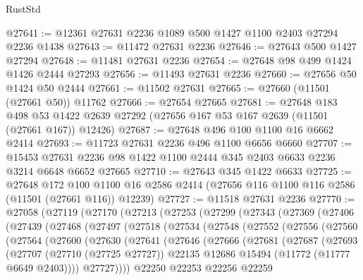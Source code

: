 \begin{lexlean}{RustStd}
\begin{coremodule}
@27641 := @12361 @27631 @2236 @1089 @500 @1427 @1100 @2403 @27294 @2236 @1438
@27643 := @11472 @27631 @2236
@27646 := @27643 @500 @1427 @27294
@27648 := @11481 @27631 @2236
@27654 := @27648 @98 @499 @1424 @1426 @2444 @27293
@27656 := @11493 @27631 @2236
@27660 := @27656 @50 @1424 @50 @2444
@27661 := @11502 @27631
@27665 := @27660 (@11501 (@27661 @50)) @11762
@27666 := @27654 @27665
@27681 := @27648
    @183
    @498
    @53
    @1422
    @2639
    @27292
    (@27656 @167 @53 @167 @2639 (@11501 (@27661 @167)) @12426)
@27687 := @27648 @496 @100 @1100 @16 @6662 @2414
@27693 := @11723 @27631 @2236 @496 @1100 @6656 @6660
@27707 := @15453 @27631 @2236 @98 @1422 @1100 @2444 @345 @2403 @6633 @2236 @3214 @6648 @6652 @27665
@27710 := @27643 @345 @1422 @6633
@27725 := @27648
    @172
    @100
    @1100
    @16
    @2586
    @2414
    (@27656 @116 @1100 @116 @2586 (@11501 (@27661 @116)) @12239)
@27727 := @11518 @27631 @2236
@27770 := @27058
    (@27119
      (@27170
        (@27213
          (@27253
            (@27299
              (@27343
                (@27369
                  (@27406
                    (@27439
                      (@27468
                        (@27497
                          (@27518
                            (@27534
                              (@27548
                                (@27552
                                  (@27556
                                    (@27560
                                      (@27564
                                        (@27600
                                          (@27630
                                            (@27641
                                              (@27646
                                                (@27666
                                                  (@27681
                                                    (@27687
                                                      (@27693
                                                        (@27707
                                                          (@27710 (@27725 @27727))
                                                          @22135
                                                          @12686
                                                          @15494
                                                          (@11772 (@11777 @6649 @2403))))
                                                      @27727))))
                                              @22250
                                              @22253
                                              @22256
                                              @22259

\end{coremodule}
\end{lexlean}
